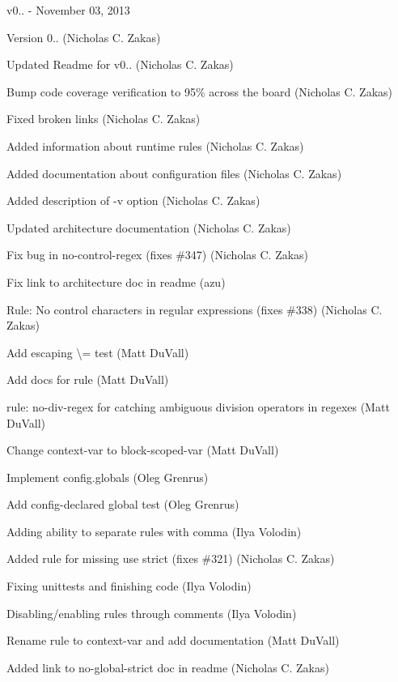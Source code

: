 v0.. -\/ November 03, 2013


\begin{DoxyItemize}
\item Version 0.. (Nicholas C. Zakas)
\item Updated Readme for v0.. (Nicholas C. Zakas)
\item Bump code coverage verification to 95\% across the board (Nicholas C. Zakas)
\item Fixed broken links (Nicholas C. Zakas)
\item Added information about runtime rules (Nicholas C. Zakas)
\item Added documentation about configuration files (Nicholas C. Zakas)
\item Added description of -\/v option (Nicholas C. Zakas)
\item Updated architecture documentation (Nicholas C. Zakas)
\item Fix bug in no-\/control-\/regex (fixes \#347) (Nicholas C. Zakas)
\item Fix link to architecture doc in readme (azu)
\item Rule\+: No control characters in regular expressions (fixes \#338) (Nicholas C. Zakas)
\item Add escaping \textbackslash{}= test (Matt Du\+Vall)
\item Add docs for rule (Matt Du\+Vall)
\item rule\+: no-\/div-\/regex for catching ambiguous division operators in regexes (Matt Du\+Vall)
\item Change context-\/var to block-\/scoped-\/var (Matt Du\+Vall)
\item Implement config.\+globals (Oleg Grenrus)
\item Add \textquotesingle{}config-\/declared global\textquotesingle{} test (Oleg Grenrus)
\item Adding ability to separate rules with comma (Ilya Volodin)
\item Added rule for missing \textquotesingle{}use strict\textquotesingle{} (fixes \#321) (Nicholas C. Zakas)
\item Fixing unittests and finishing code (Ilya Volodin)
\item Disabling/enabling rules through comments (Ilya Volodin)
\item Rename rule to context-\/var and add documentation (Matt Du\+Vall)
\item Added link to no-\/global-\/strict doc in readme (Nicholas C. Zakas)

\end{DoxyItemize}
